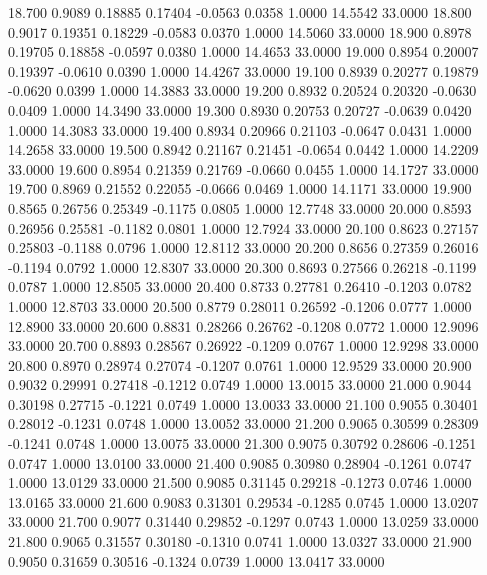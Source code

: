   18.700   0.9089   0.18885   0.17404  -0.0563   0.0358   1.0000  14.5542  33.0000
  18.800   0.9017   0.19351   0.18229  -0.0583   0.0370   1.0000  14.5060  33.0000
  18.900   0.8978   0.19705   0.18858  -0.0597   0.0380   1.0000  14.4653  33.0000
  19.000   0.8954   0.20007   0.19397  -0.0610   0.0390   1.0000  14.4267  33.0000
  19.100   0.8939   0.20277   0.19879  -0.0620   0.0399   1.0000  14.3883  33.0000
  19.200   0.8932   0.20524   0.20320  -0.0630   0.0409   1.0000  14.3490  33.0000
  19.300   0.8930   0.20753   0.20727  -0.0639   0.0420   1.0000  14.3083  33.0000
  19.400   0.8934   0.20966   0.21103  -0.0647   0.0431   1.0000  14.2658  33.0000
  19.500   0.8942   0.21167   0.21451  -0.0654   0.0442   1.0000  14.2209  33.0000
  19.600   0.8954   0.21359   0.21769  -0.0660   0.0455   1.0000  14.1727  33.0000
  19.700   0.8969   0.21552   0.22055  -0.0666   0.0469   1.0000  14.1171  33.0000
  19.900   0.8565   0.26756   0.25349  -0.1175   0.0805   1.0000  12.7748  33.0000
  20.000   0.8593   0.26956   0.25581  -0.1182   0.0801   1.0000  12.7924  33.0000
  20.100   0.8623   0.27157   0.25803  -0.1188   0.0796   1.0000  12.8112  33.0000
  20.200   0.8656   0.27359   0.26016  -0.1194   0.0792   1.0000  12.8307  33.0000
  20.300   0.8693   0.27566   0.26218  -0.1199   0.0787   1.0000  12.8505  33.0000
  20.400   0.8733   0.27781   0.26410  -0.1203   0.0782   1.0000  12.8703  33.0000
  20.500   0.8779   0.28011   0.26592  -0.1206   0.0777   1.0000  12.8900  33.0000
  20.600   0.8831   0.28266   0.26762  -0.1208   0.0772   1.0000  12.9096  33.0000
  20.700   0.8893   0.28567   0.26922  -0.1209   0.0767   1.0000  12.9298  33.0000
  20.800   0.8970   0.28974   0.27074  -0.1207   0.0761   1.0000  12.9529  33.0000
  20.900   0.9032   0.29991   0.27418  -0.1212   0.0749   1.0000  13.0015  33.0000
  21.000   0.9044   0.30198   0.27715  -0.1221   0.0749   1.0000  13.0033  33.0000
  21.100   0.9055   0.30401   0.28012  -0.1231   0.0748   1.0000  13.0052  33.0000
  21.200   0.9065   0.30599   0.28309  -0.1241   0.0748   1.0000  13.0075  33.0000
  21.300   0.9075   0.30792   0.28606  -0.1251   0.0747   1.0000  13.0100  33.0000
  21.400   0.9085   0.30980   0.28904  -0.1261   0.0747   1.0000  13.0129  33.0000
  21.500   0.9085   0.31145   0.29218  -0.1273   0.0746   1.0000  13.0165  33.0000
  21.600   0.9083   0.31301   0.29534  -0.1285   0.0745   1.0000  13.0207  33.0000
  21.700   0.9077   0.31440   0.29852  -0.1297   0.0743   1.0000  13.0259  33.0000
  21.800   0.9065   0.31557   0.30180  -0.1310   0.0741   1.0000  13.0327  33.0000
  21.900   0.9050   0.31659   0.30516  -0.1324   0.0739   1.0000  13.0417  33.0000

